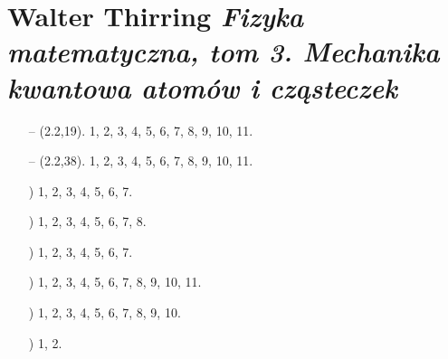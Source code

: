 \documentclass[a4paper,11pt]{article}
\numberwithin{equation}{section}
\begin{document}
\section{Walter Thirring \textit{Fizyka matematyczna, tom 3.
    Mechanika kwantowa atomów i cząsteczek}}

\label{sec:Oznaczenia-i-konwencje}


\begin{itemize}

\item[--] (2.2,19). 1, 2, 3, 4, 5, 6, 7, 8, 9, 10, 11.

\item[--] (2.2,38). 1, 2, 3, 4, 5, 6, 7, 8, 9, 10, 11.

\item[\romannumeral4)] 1, 2, 3, 4, 5, 6, 7.

\item[\romannumeral5)] 1, 2, 3, 4, 5, 6, 7, 8.

\item[\romannumeral6)] 1, 2, 3, 4, 5, 6, 7.

\item[\romannumeral7)] 1, 2, 3, 4, 5, 6, 7, 8, 9, 10, 11.

\item[\romannumeral8)] 1, 2, 3, 4, 5, 6, 7, 8, 9, 10.

\item[\romannumeral9)] 1, 2.











\end{itemize}























% 







\end{document}
